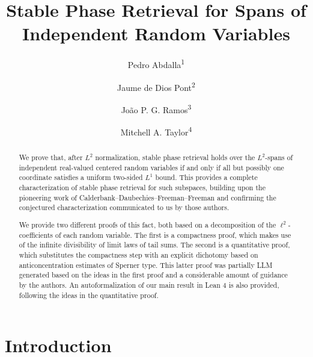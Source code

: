 \documentclass[11pt]{amsart}
\title[Stable Phase Retrieval for Independent Random Variables]{Stable Phase Retrieval for Spans of Independent Random Variables}
\author{Pedro Abdalla\textsuperscript{1}}
\author{Jaume de Dios Pont\textsuperscript{2}}
\author{Jo\~ao P. G. Ramos\textsuperscript{3}}
\author{Mitchell A. Taylor\textsuperscript{4}}
\numberwithin{equation}{section}
\theoremstyle{definition}
\theoremstyle{remark}
\begin{document}

\begin{abstract} We prove that, after $L^2$ normalization, stable phase retrieval
holds over the $L^2$-spans of independent real-valued centered random variables if and only if all but possibly one coordinate satisfies a uniform two-sided
$L^1$ bound. This provides a complete characterization of stable phase retrieval for such subspaces, building upon the pioneering work of Calderbank--Daubechies--Freeman--Freeman and confirming the conjectured characterization communicated to us by those authors.

We provide two different proofs of this fact, both based on a decomposition of the $\ell^2$-coefficients of each random variable.  The first is a compactness proof, which makes use of the infinite divisibility of limit laws of tail sums. The second is a quantitative proof, which substitutes the compactness step with an explicit dichotomy based on anticoncentration estimates of Sperner type. This latter proof was partially LLM generated based on the ideas in the first proof and a considerable amount of guidance by the authors. An autoformalization of our main result in Lean 4 is also provided, following the ideas in the quantitative proof. 
\end{abstract}

\maketitle
\begingroup
\renewcommand{\thefootnote}{\arabic{footnote}}
\endgroup
\setcounter{footnote}{0}

\section{Introduction}
\end{document}
